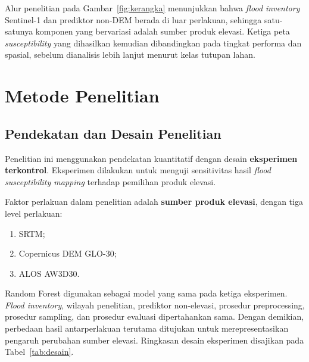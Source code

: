 \documentclass[12pt]{article}
\begin{document}
Alur penelitian pada Gambar~\ref{fig:kerangka} menunjukkan bahwa
\textit{flood inventory} Sentinel-1 dan prediktor non-DEM berada di luar
perlakuan, sehingga satu-satunya komponen yang bervariasi adalah sumber
produk elevasi. Ketiga peta \textit{susceptibility} yang dihasilkan kemudian
dibandingkan pada tingkat performa dan spasial, sebelum dianalisis lebih
lanjut menurut kelas tutupan lahan.


\clearpage
\section{Metode Penelitian}

\subsection{Pendekatan dan Desain Penelitian}

Penelitian ini menggunakan pendekatan kuantitatif dengan desain
\textbf{eksperimen terkontrol}. Eksperimen dilakukan untuk menguji
sensitivitas hasil \textit{flood susceptibility mapping} terhadap pemilihan
produk elevasi.

Faktor perlakuan dalam penelitian adalah \textbf{sumber produk elevasi},
dengan tiga level perlakuan:

\begin{enumerate}
\item SRTM;
\item Copernicus DEM GLO-30;
\item ALOS AW3D30.
\end{enumerate}

Random Forest digunakan sebagai model yang sama pada ketiga eksperimen.
\textit{Flood inventory}, wilayah penelitian, prediktor non-elevasi, prosedur
preprocessing, prosedur sampling, dan prosedur evaluasi dipertahankan sama.
Dengan demikian, perbedaan hasil antarperlakuan terutama ditujukan untuk
merepresentasikan pengaruh perubahan sumber elevasi. Ringkasan desain
eksperimen disajikan pada Tabel~\ref{tab:desain}.
\end{document}
